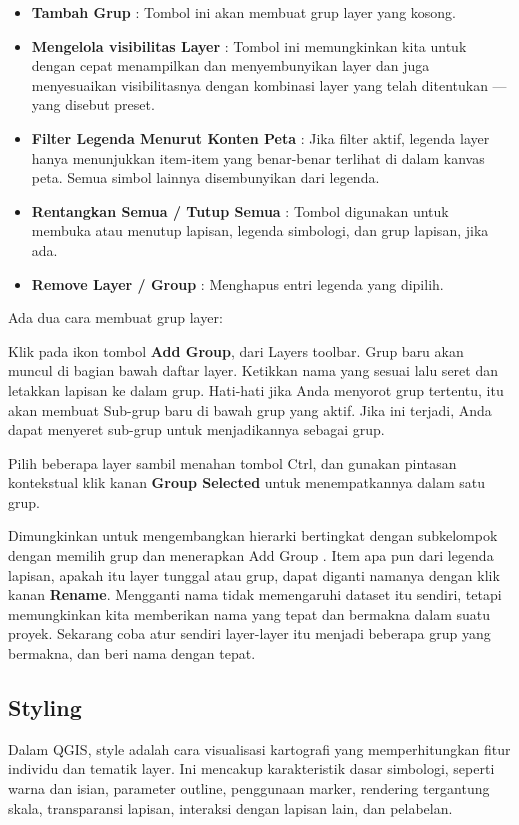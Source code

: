 \documentclass[]{book}
\begin{document}
\begin{itemize}
\item
  \textbf{Tambah Grup} : Tombol ini akan membuat grup layer yang kosong.
\item
  \textbf{Mengelola visibilitas Layer} : Tombol ini memungkinkan kita untuk dengan cepat menampilkan dan menyembunyikan layer dan juga menyesuaikan visibilitasnya dengan kombinasi layer yang telah ditentukan --- yang disebut preset.
\item
  \textbf{Filter Legenda Menurut Konten Peta} : Jika filter aktif, legenda layer hanya menunjukkan item-item yang benar-benar terlihat di dalam kanvas peta. Semua simbol lainnya disembunyikan dari legenda.
\item
  \textbf{Rentangkan Semua / Tutup Semua} : Tombol digunakan untuk membuka atau menutup lapisan, legenda simbologi, dan grup lapisan, jika ada.
\item
  \textbf{Remove Layer / Group} : Menghapus entri legenda yang dipilih.
\end{itemize}

Ada dua cara membuat grup layer:

Klik pada ikon tombol \textbf{Add Group}, dari Layers toolbar. Grup baru akan muncul di bagian bawah daftar layer. Ketikkan nama yang sesuai lalu seret dan letakkan lapisan ke dalam grup. Hati-hati jika Anda menyorot grup tertentu, itu akan membuat Sub-grup baru di bawah grup yang aktif. Jika ini terjadi, Anda dapat menyeret sub-grup untuk menjadikannya sebagai grup.

Pilih beberapa layer sambil menahan tombol Ctrl, dan gunakan pintasan kontekstual klik kanan \textbf{Group Selected} untuk menempatkannya dalam satu grup.

Dimungkinkan untuk mengembangkan hierarki bertingkat dengan subkelompok dengan memilih grup dan menerapkan Add Group . Item apa pun dari legenda lapisan, apakah itu layer tunggal atau grup, dapat diganti namanya dengan klik kanan \textbf{Rename}. Mengganti nama tidak memengaruhi dataset itu sendiri, tetapi memungkinkan kita memberikan nama yang tepat dan bermakna dalam suatu proyek. Sekarang coba atur sendiri layer-layer itu menjadi beberapa grup yang bermakna, dan beri nama dengan tepat.

\hypertarget{styling}{%
\subsection{Styling}\label{styling}}

Dalam QGIS, style adalah cara visualisasi kartografi yang memperhitungkan fitur individu dan tematik layer. Ini mencakup karakteristik dasar simbologi, seperti warna dan isian, parameter outline, penggunaan marker, rendering tergantung skala, transparansi lapisan, interaksi dengan lapisan lain, dan pelabelan.
\end{document}
